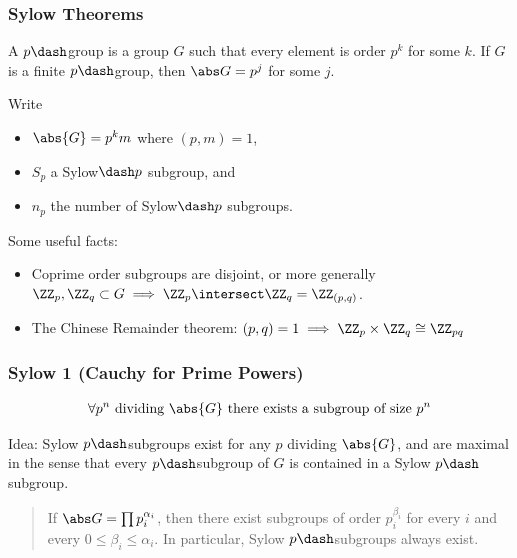 \hypertarget{sylow-theorems}{%
\subsubsection{Sylow Theorems}\label{sylow-theorems}}

\begin{definition}

A \(p\dash\)group is a group \(G\) such that every element is order
\(p^k\) for some \(k\). If \(G\) is a finite \(p\dash\)group, then
\(\abs G = p^j\) for some \(j\).

\end{definition}

Write

\begin{itemize}
\tightlist
\item
  \(\abs{G} = p^k m\) where \((p, m) = 1\),
\item
  \(S_p\) a Sylow\(\dash p\) subgroup, and
\item
  \(n_p\) the number of Sylow\(\dash p\) subgroups.
\end{itemize}

Some useful facts:

\begin{itemize}
\item
  Coprime order subgroups are disjoint, or more generally
  \(\ZZ_p, \ZZ_q \subset G \implies \ZZ_p \intersect \ZZ_q = \ZZ_{(p,q)}\).
\item
  The Chinese Remainder theorem:
  \((p, q) = 1 \implies \ZZ_p \times \ZZ_q \cong \ZZ_{pq}\)
\end{itemize}

\hypertarget{sylow-1-cauchy-for-prime-powers}{%
\subsubsection{Sylow 1 (Cauchy for Prime
Powers)}\label{sylow-1-cauchy-for-prime-powers}}

\begin{align*}
\forall p^n \text{ dividing } \abs{G} \text{ there exists a subgroup of size } p^n
\end{align*}

Idea: Sylow \(p\dash\)subgroups exist for any \(p\) dividing
\(\abs{G}\), and are maximal in the sense that every \(p\dash\)subgroup
of \(G\) is contained in a Sylow \(p\dash\)subgroup.

\begin{quote}
If \(\abs G = \prod p_i^{\alpha_i}\), then there exist subgroups of
order \(p_i^{\beta_i}\) for every \(i\) and every
\(0 \leq \beta_i \leq \alpha_i\). In particular, Sylow
\(p\dash\)subgroups always exist.
\end{quote}

